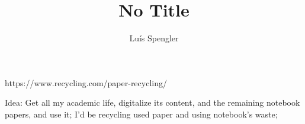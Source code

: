 \documentclass{article}
\author{Luís Spengler}
\title{No Title}
\date{}
\begin{document}
\maketitle
\sffamily

https://www.recycling.com/paper-recycling/

Idea: Get all my academic life, digitalize its content, and the remaining notebook papers, and use it;
I'd be recycling used paper and using notebook's waste;
\end{document}
